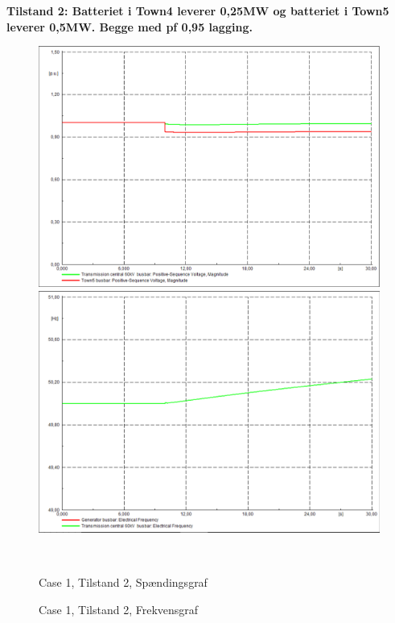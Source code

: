 \textbf{Tilstand 2: Batteriet i Town4 leverer 0,25MW og batteriet i Town5 leverer 0,5MW. Begge med pf 0,95 lagging.}
\begin{figure}[H]
	\centering
	\begin{minipage}[b]{0.48\textwidth}
		\centering
		\includegraphics[width=1.00\textwidth]{figurer/SmallDisturbance/Voltage2} %
	\end{minipage}
	\hfill
	\begin{minipage}[b]{0.48\textwidth}
		\centering
		\includegraphics[width=1.00\textwidth]{figurer/SmallDisturbance/Freq2} %
	\end{minipage}
	\\ %
	\begin{minipage}[t]{0.48\textwidth}
		\caption{Case 1, Tilstand 2, Spændingsgraf} %
		\label{fig:C1T2V}
	\end{minipage}
	\hfill
	\begin{minipage}[t]{0.48\textwidth}
		\caption{Case 1, Tilstand 2, Frekvensgraf} %
		\label{fig:C1T2F}
	\end{minipage}
\end{figure}

